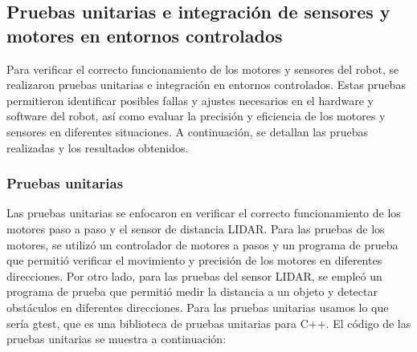 \subsection{Pruebas unitarias e integraci\'on de sensores y motores en entornos controlados} %
\label{sub:Prub01}

    Para verificar el correcto funcionamiento de los motores y sensores del robot, se realizaron pruebas unitarias e integraci\'on en entornos controlados. 
    Estas pruebas permitieron identificar posibles fallas y ajustes necesarios en el hardware y software del robot, as\'i como evaluar la precisi\'on y 
    eficiencia de los motores y sensores en diferentes situaciones. A continuaci\'on, se detallan las pruebas realizadas y los resultados obtenidos.

    \subsubsection{Pruebas unitarias} %
    \label{ssub:Pruebas unitarias}
        Las pruebas unitarias se enfocaron en verificar el correcto funcionamiento de los motores paso a paso y el sensor de distancia LIDAR. 
        Para las pruebas de los motores, se utiliz\'o un controlador de motores a pasos y un programa de prueba que permiti\'o verificar el 
        movimiento y precisi\'on de los motores en diferentes direcciones. Por otro lado, para las pruebas del sensor LIDAR, se emple\'o un 
        programa de prueba que permiti\'o medir la distancia a un objeto y detectar obst\'aculos en diferentes direcciones. 
        Para las pruebas unitarias usamos lo que ser\'ia gtest, que es una biblioteca de pruebas unitarias para C++.
        \vskip 0.5cm
        El c\'odigo de las pruebas unitarias se muestra a continuaci\'on:
